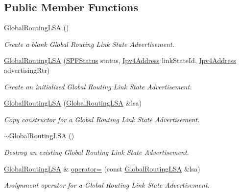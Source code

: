 \subsection*{Public Member Functions}
\begin{DoxyCompactItemize}
\item 
\hyperlink{classns3_1_1GlobalRoutingLSA_a64ecdd901f6589ba65da2833fe98efa9}{Global\+Routing\+L\+SA} ()
\begin{DoxyCompactList}\small\item\em Create a blank Global Routing Link State Advertisement. \end{DoxyCompactList}\item 
\hyperlink{classns3_1_1GlobalRoutingLSA_ab66496ef9e09190486625e6df36924cc}{Global\+Routing\+L\+SA} (\hyperlink{classns3_1_1GlobalRoutingLSA_a18bf63da580856fe1cc158aa855af1bd}{S\+P\+F\+Status} status, \hyperlink{classns3_1_1Ipv4Address}{Ipv4\+Address} link\+State\+Id, \hyperlink{classns3_1_1Ipv4Address}{Ipv4\+Address} advertising\+Rtr)
\begin{DoxyCompactList}\small\item\em Create an initialized Global Routing Link State Advertisement. \end{DoxyCompactList}\item 
\hyperlink{classns3_1_1GlobalRoutingLSA_a4395b5b3f4384c99bbdf6a0f2caf1bc6}{Global\+Routing\+L\+SA} (\hyperlink{classns3_1_1GlobalRoutingLSA}{Global\+Routing\+L\+SA} \&lsa)
\begin{DoxyCompactList}\small\item\em Copy constructor for a Global Routing Link State Advertisement. \end{DoxyCompactList}\item 
\hyperlink{classns3_1_1GlobalRoutingLSA_a8e8cef25c1fc662b7f2402f75981869a}{$\sim$\+Global\+Routing\+L\+SA} ()
\begin{DoxyCompactList}\small\item\em Destroy an existing Global Routing Link State Advertisement. \end{DoxyCompactList}\item 
\hyperlink{classns3_1_1GlobalRoutingLSA}{Global\+Routing\+L\+SA} \& \hyperlink{classns3_1_1GlobalRoutingLSA_af6c9e006d7a36c24dd6b8360b257a7c0}{operator=} (const \hyperlink{classns3_1_1GlobalRoutingLSA}{Global\+Routing\+L\+SA} \&lsa)
\begin{DoxyCompactList}\small\item\em Assignment operator for a Global Routing Link State Advertisement. \end{DoxyCompactList}\item 

\end{DoxyCompactItemize}
